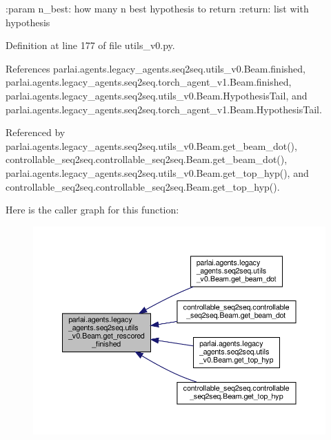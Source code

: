 \begin{DoxyVerb}:param n_best: how many n best hypothesis to return
:return: list with hypothesis
\end{DoxyVerb}
 

Definition at line 177 of file utils\+\_\+v0.\+py.



References parlai.\+agents.\+legacy\+\_\+agents.\+seq2seq.\+utils\+\_\+v0.\+Beam.\+finished, parlai.\+agents.\+legacy\+\_\+agents.\+seq2seq.\+torch\+\_\+agent\+\_\+v1.\+Beam.\+finished, parlai.\+agents.\+legacy\+\_\+agents.\+seq2seq.\+utils\+\_\+v0.\+Beam.\+Hypothesis\+Tail, and parlai.\+agents.\+legacy\+\_\+agents.\+seq2seq.\+torch\+\_\+agent\+\_\+v1.\+Beam.\+Hypothesis\+Tail.



Referenced by parlai.\+agents.\+legacy\+\_\+agents.\+seq2seq.\+utils\+\_\+v0.\+Beam.\+get\+\_\+beam\+\_\+dot(), controllable\+\_\+seq2seq.\+controllable\+\_\+seq2seq.\+Beam.\+get\+\_\+beam\+\_\+dot(), parlai.\+agents.\+legacy\+\_\+agents.\+seq2seq.\+utils\+\_\+v0.\+Beam.\+get\+\_\+top\+\_\+hyp(), and controllable\+\_\+seq2seq.\+controllable\+\_\+seq2seq.\+Beam.\+get\+\_\+top\+\_\+hyp().

Here is the caller graph for this function\+:
\nopagebreak
\begin{figure}[H]
\begin{center}
\leavevmode
\includegraphics[width=350pt]{classparlai_1_1agents_1_1legacy__agents_1_1seq2seq_1_1utils__v0_1_1Beam_a3c573eb1104002cb7da1483a6afb3cfe_icgraph}
\end{center}
\end{figure}
\mbox{\label{classparlai_1_1agents_1_1legacy__agents_1_1seq2seq_1_1utils__v0_1_1Beam_abbb522afdc69dbce77f997dd392c5c1d}} 
